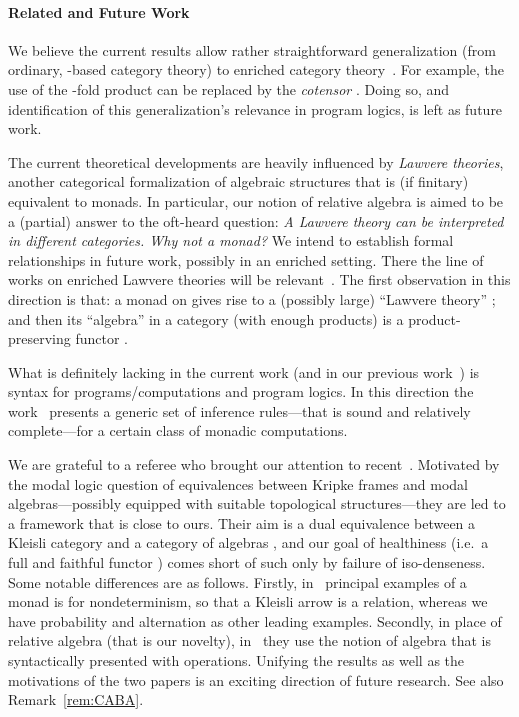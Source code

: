 \documentclass[9pt, preprint]{sigplanconf}
\theoremstyle{theorem}
\theoremstyle{definition}
\begin{document}
\paragraph{Related and Future Work}
We believe the current results allow rather straightforward
generalization (from ordinary, -based category theory) to
enriched category theory~\cite{Kelly82}. For example, the use of
the -fold product  can be replaced by the \emph{cotensor}
. Doing so, and identification of this generalization's
relevance in program logics, is left as future work.

The current theoretical developments are heavily influenced by
\emph{Lawvere theories}, another categorical formalization of algebraic
structures that is (if finitary) equivalent to monads.
In particular, our notion of relative algebra is aimed to be a (partial)
answer to the oft-heard question: \emph{A Lawvere theory can be interpreted
in different categories. Why not a monad?} We intend to
establish
formal relationships in  future work, possibly in an enriched
setting.
 There the line of works on enriched Lawvere theories will be
relevant~\cite{LackP09,hyland2007category}.
The first observation in this direction is that: a monad  on 
gives rise to a (possibly large) ``Lawvere theory'' ; and
then its ``algebra'' in a category  (with enough products)
is a product-preserving functor . 

What is definitely lacking in the current work (and in our previous work~\cite{Jacobs15CALCO,Hasuo15TCS}) is  syntax for
programs/computations and program logics. In this direction the
work~\cite{GoncharovS13b} presents a generic  set of inference
rules---that is sound and relatively
complete---for a certain class of monadic computations.

We are grateful to a referee who brought our attention to
recent~\cite{HofmannN15}. Motivated by the modal logic question of
equivalences between Kripke frames and modal algebras---possibly
equipped with suitable topological structures---they are led to a
framework that is close to ours.  Their aim is a dual equivalence
between a Kleisli category  and a category of algebras
, and our goal of healthiness (i.e.\ a full and faithful
functor ) comes short of such only by failure of
iso-denseness. Some notable differences are as follows. Firstly,
in~\cite{HofmannN15} principal examples of a monad  is for
nondeterminism, so that a Kleisli arrow is a relation, whereas we have
probability and alternation as other leading examples.  Secondly, in
place of relative algebra (that is our novelty), in~\cite{HofmannN15}
they use the notion of algebra that is syntactically presented with
operations. Unifying the results as well as the motivations of the two
papers is an exciting direction of future research. See also
Remark~\ref{rem:CABA}.
\end{document}
